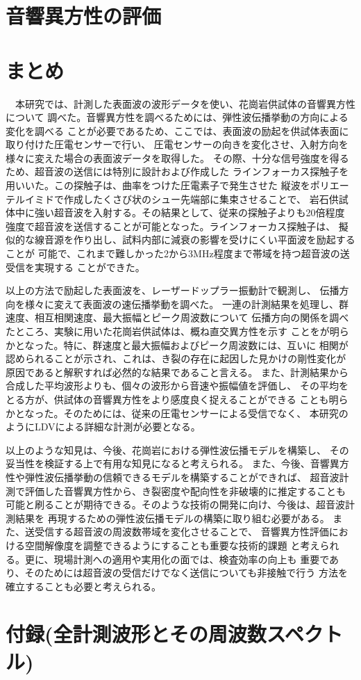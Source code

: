 ﻿\documentclass[11pt,a4j]{jarticle}
\begin{document}
\section{音響異方性の評価}

\newpage
\section{まとめ}
　本研究では、計測した表面波の波形データを使い、花崗岩供試体の音響異方性について
調べた。音響異方性を調べるためには、弾性波伝播挙動の方向による変化を調べる
ことが必要であるため、ここでは、表面波の励起を供試体表面に取り付けた圧電センサーで行い、
圧電センサーの向きを変化させ、入射方向を様々に変えた場合の表面波データを取得した。
その際、十分な信号強度を得るため、超音波の送信には特別に設計および作成した
ラインフォーカス探触子を用いいた。この探触子は、曲率をつけた圧電素子で発生させた
縦波をポリエーテルイミドで作成したくさび状のシュー先端部に集束させることで、
岩石供試体中に強い超音波を入射する。その結果として、従来の探触子よりも20倍程度
強度で超音波を送信することが可能となった。ラインフォーカス探触子は、
擬似的な線音源を作り出し、試料内部に減衰の影響を受けにくい平面波を励起することが
可能で、これまで難しかった2から3MHz程度まで帯域を持つ超音波の送受信を実現する
ことができた。

以上の方法で励起した表面波を、レーザードップラー振動計で観測し、
伝播方向を様々に変えて表面波の速伝播挙動を調べた。
一連の計測結果を処理し、群速度、相互相関速度、最大振幅とピーク周波数について
伝播方向の関係を調べたところ、実験に用いた花崗岩供試体は、概ね直交異方性を示す
ことをが明らかとなった。特に、群速度と最大振幅およびピーク周波数には、互いに
相関が認められることが示され、これは、き裂の存在に起因した見かけの剛性変化が
原因であると解釈すれば必然的な結果であること言える。
また、計測結果から合成した平均波形よりも、個々の波形から音速や振幅値を評価し、
その平均をとる方が、供試体の音響異方性をより感度良く捉えることができる
ことも明らかとなった。そのためには、従来の圧電センサーによる受信でなく、
本研究のようにLDVによる詳細な計測が必要となる。

以上のような知見は、今後、花崗岩における弾性波伝播モデルを構築し、
その妥当性を検証する上で有用な知見になると考えられる。
また、今後、音響異方性や弾性波伝播挙動の信頼できるモデルを構築することができれば、
超音波計測で評価した音響異方性から、き裂密度や配向性を非破壊的に推定することも
可能と刷ることが期待できる。そのような技術の開発に向け、今後は、超音波計測結果を
再現するための弾性波伝播モデルの構築に取り組む必要がある。
また、送受信する超音波の周波数帯域を変化させることで、
音響異方性評価における空間解像度を調整できるようにすることも重要な技術的課題
と考えられる。更に、現場計測への適用や実用化の面では、検査効率の向上も
重要であり、そのためには超音波の受信だけでなく送信についても非接触で行う
方法を確立することも必要と考えられる。
\section{付録(全計測波形とその周波数スペクトル)}

\end{document}
